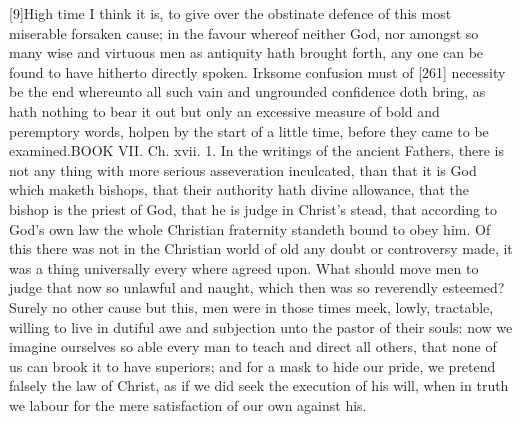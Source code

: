 [9]High time I think it is, to give over the obstinate defence of this most miserable forsaken cause; in the favour whereof neither God, nor amongst so many wise and virtuous men as antiquity hath brought forth, any one can be found to have hitherto directly spoken. Irksome confusion must of [261] necessity be the end whereunto all such vain and ungrounded confidence doth bring, as hath nothing to bear it out but only an excessive measure of bold and peremptory words, holpen by the start of a little time, before they came to be examined.BOOK VII. Ch. xvii. 1. In the writings of the ancient Fathers, there is not any thing with more serious asseveration inculcated, than that it is God which maketh bishops, that their authority hath divine allowance, that the bishop is the priest of God, that he is judge in Christ’s stead, that according to God’s own law the whole Christian fraternity standeth bound to obey him. Of this there was not in the Christian world of old any doubt or controversy made, it was a thing universally every where agreed upon. What should move men to judge that now so unlawful and naught, which then was so reverendly esteemed? Surely no other cause but this, men were in those times meek, lowly, tractable, willing to live in dutiful awe and subjection unto the pastor of their souls: now we imagine ourselves so able every man to teach and direct all others, that none of us can brook it to have superiors; and for a mask to hide our pride, we pretend falsely the law of Christ, as if we did seek the execution of his will, when in truth we labour for the mere satisfaction of our own against his.

